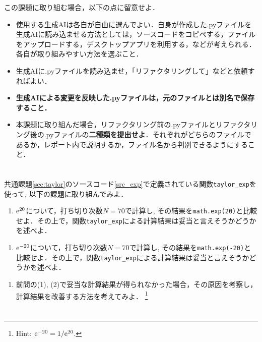 \documentclass[a4paper,12pt]{jsarticle}
\begin{document}
この課題に取り組む場合，以下の点に留意せよ．
\begin{itemize}
    \item 使用する生成AIは各自が自由に選んでよい．自身が作成した.pyファイルを生成AIに読み込ませる方法としては，ソースコードをコピペする，ファイルをアップロードする，デスクトップアプリを利用する，などが考えられる．各自が取り組みやすい方法を選ぶこと．
    \item 生成AIに.pyファイルを読み込ませ，「リファクタリングして」などと依頼すればよい．
    \item {\bf 生成AIによる変更を反映した.pyファイルは，元のファイルとは別名で保存すること．}
    \item 本課題に取り組んだ場合，リファクタリング前の.pyファイルとリファクタリング後の.pyファイルの{\bf 二種類を提出せよ}．それぞれがどちらのファイルであるか，レポート内で説明するか，ファイル名から判別できるようにすること．
\end{itemize}


\section{}
\label{sec:taylor_is_wrong?}

共通課題\ref{sec:taylor}のソースコード\ref{src_exp}で定義されている関数\texttt{taylor\_exp}を使って, 以下の課題に取り組んでみよ．

\begin{enumerate}
    \item[(1)] ${\rm e}^{20}$について，打ち切り次数$N=70$で計算し, その結果を\texttt{math.exp(20)}と比較せよ．その上で，関数\texttt{taylor\_exp}による計算結果は妥当と言えそうかどうかを述べよ．
\end{enumerate}
\begin{enumerate}
    \item[(2)] ${\rm e}^{-20}$について，打ち切り次数$N=70$で計算し, その結果を\texttt{math.exp(-20)}と比較せよ．その上で，関数\texttt{taylor\_exp}による計算結果は妥当と言えそうかどうかを述べよ．
\end{enumerate}
\begin{enumerate}
    \item[(3)] 前問の(1), (2)で妥当な計算結果が得られなかった場合，その原因を考察し，計算結果を改善する方法を考えてみよ．
    \footnote{
    Hint: ${\rm e}^{-20}=1/{\rm e}^{20}$.
    }
\end{enumerate}

\section{}
\label{sec:acc_conv}
\end{document}
